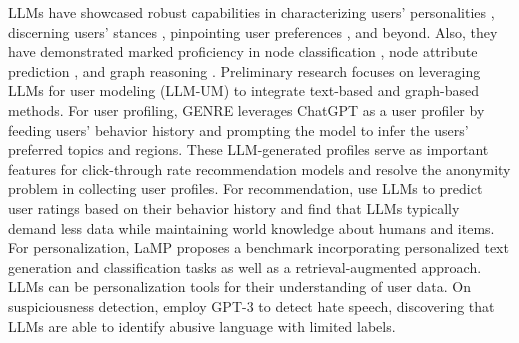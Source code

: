 \documentclass[11pt]{article}
\begin{document}
LLMs have showcased robust capabilities in characterizing users' personalities \cite{rao2023can}, discerning users' stances \cite{zhang2022would}, pinpointing user preferences \cite{fang2023chatgpt}, and beyond. Also, they have demonstrated marked proficiency in node classification \cite{ye2023natural}, node attribute prediction \cite{he2023explanations}, and graph reasoning \cite{wang2023can}. Preliminary research focuses on leveraging LLMs for user modeling (LLM-UM) to integrate text-based and graph-based methods. For user profiling, GENRE \cite{liu2023genre} leverages ChatGPT as a user profiler by feeding users' behavior history and prompting the model to infer the users' preferred topics and regions. These LLM-generated profiles serve as important features for click-through rate recommendation models and resolve the anonymity problem in collecting user profiles. For recommendation, \citet{kang2023llms} use LLMs to predict user ratings based on their behavior history and find that LLMs typically demand less data while maintaining world knowledge about humans and items. For personalization, LaMP \cite{salemi2023lamp} proposes a benchmark incorporating personalized text generation and classification tasks as well as a retrieval-augmented approach. LLMs can be personalization tools for their understanding of user data. On suspiciousness detection, \citet{chiu2021detecting} employ GPT-3 to detect hate speech, discovering that LLMs are able to identify abusive language with limited labels.

\end{document}
